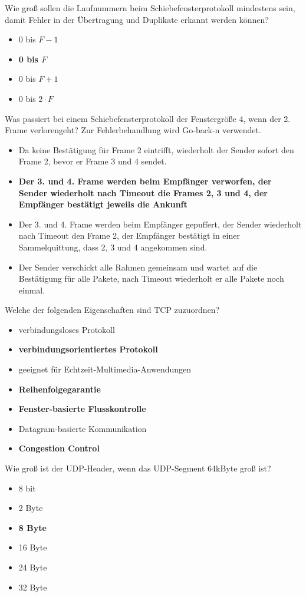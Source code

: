 \documentclass{article}
\begin{document}
	Wie groß sollen die Laufnummern beim Schiebefensterprotokoll mindestens sein, damit Fehler in der Übertragung und Duplikate erkannt werden können?
	\begin{itemize}
		\item 0 bis $F-1$
		\item \textbf{0 bis $F$}
		\item 0 bis $F+1$
		\item 0 bis $2\cdot F$
	\end{itemize}

	Was passiert bei einem Schiebefensterprotokoll der Fenstergröße 4, wenn der 2. Frame verlorengeht? Zur Fehlerbehandlung wird Go-back-n verwendet.
	\begin{itemize}
		\item Da keine Bestätigung für Frame 2 eintrifft, wiederholt der Sender sofort den Frame 2, bevor er Frame 3 und 4 sendet.
		\item \textbf{Der 3. und 4. Frame werden beim Empfänger verworfen, der Sender wiederholt nach Timeout die Frames 2, 3 und 4, der Empfänger bestätigt jeweils die Ankunft} 
		\item Der 3. und 4. Frame werden beim Empfänger gepuffert, der Sender wiederholt nach Timeout den Frame 2, der Empfänger bestätigt in einer Sammelquittung, dass 2, 3 und 4 angekommen sind. 
		\item Der Sender verschickt alle Rahmen gemeinsam und wartet auf die Bestätigung für alle Pakete, nach Timeout wiederholt er alle Pakete noch einmal.
	\end{itemize}

	Welche der folgenden Eigenschaften sind TCP zuzuordnen? 
	\begin{itemize}
		\item verbindungsloses Protokoll
		\item \textbf{verbindungsorientiertes Protokoll}
		\item geeignet für Echtzeit-Multimedia-Anwendungen
		\item \textbf{Reihenfolgegarantie}
		\item \textbf{Fenster-basierte Flusskontrolle}
		\item Datagram-basierte Kommunikation
		\item \textbf{Congestion Control}
	\end{itemize}

	Wie groß ist der UDP-Header, wenn das UDP-Segment 64kByte groß ist? 
	\begin{itemize}
		\item 8 bit
		\item 2 Byte
		\item \textbf{8 Byte}
		\item 16 Byte
		\item 24 Byte
		\item 32 Byte
	\end{itemize}
\end{document}
